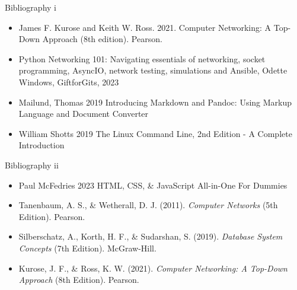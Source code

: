 \documentclass[
  ignorenonframetext,
]{beamer}
\providecommand{\tightlist}{%
  \setlength{\itemsep}{0pt}\setlength{\parskip}{0pt}}
\begin{document}
\begin{frame}{Bibliography i}
\protect{}\label{bibliography-i}
\begin{itemize}
\tightlist
\item
  James F. Kurose and Keith W. Ross. 2021. Computer Networking: A
  Top-Down Approach (8th edition). Pearson.
\item
  Python Networking 101: Navigating essentials of networking, socket
  programming, AsyncIO, network testing, simulations and Ansible, Odette
  Windows, GiftforGits, 2023
\item
  Mailund, Thomas 2019 Introducing Markdown and Pandoc: Using Markup
  Language and Document Converter
\item
  William Shotts 2019 The Linux Command Line, 2nd Edition - A Complete
  Introduction
\end{itemize}
\end{frame}

\begin{frame}{Bibliography ii}
\protect{}\label{bibliography-ii}
\begin{itemize}
\tightlist
\item
  Paul McFedries 2023 HTML, CSS, \& JavaScript All-in-One For Dummies
\item
  Tanenbaum, A. S., \& Wetherall, D. J. (2011). \emph{Computer Networks}
  (5th Edition). Pearson.
\item
  Silberschatz, A., Korth, H. F., \& Sudarshan, S. (2019).
  \emph{Database System Concepts} (7th Edition). McGraw-Hill.
\item
  Kurose, J. F., \& Ross, K. W. (2021). \emph{Computer Networking: A
  Top-Down Approach} (8th Edition). Pearson.
\end{itemize}
\end{frame}
\end{document}
